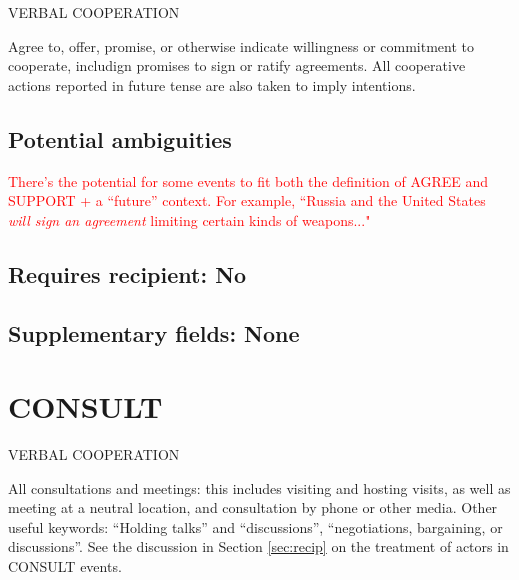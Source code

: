 \documentclass[11pt]{report}
\newcommand{\plcat}[1]{\textsf{#1}}
\newcommand{\andy}[1]{\textcolor{red}{#1}}
\begin{document}
\textsf{VERBAL COOPERATION} \vspace{8pt}

Agree to, offer, promise, or otherwise indicate willingness or commitment to cooperate, includign promises to sign or ratify agreements.  All cooperative actions reported in future tense are also taken to imply intentions. 

\begin{comment}
pas 2018-01-06

As I'm going through a lot of GSRs, I'm beginning to wonder whether we should combine AGREE and SUPPORT: it's not really clear to me whether the boundary is between them. This would continue a consolidation of the various WEIS verbal categories -- e.g. AGREE/PROMISE, WARNING/THREAT -- that we initiated with CAMEO.
\end{comment}

\subsection{Potential ambiguities}

\andy{There's the potential for some events to fit both the definition of \plcat{AGREE} and \plcat{SUPPORT} + a ``future'' context. For example, ``Russia and the United States \emph{will sign an agreement} limiting certain kinds of weapons..."}

\subsection{Requires recipient: No}

\subsection{Supplementary fields: None}

\bigskip  

\section{CONSULT}

\textsf{VERBAL COOPERATION} \vspace{8pt}

All consultations and meetings: this includes visiting and hosting visits, as well as meeting at a neutral location, and consultation by phone or other media. Other useful keywords: ``Holding talks'' and ``discussions'', ``negotiations, bargaining, or discussions''. See the discussion in Section \ref{sec:recip} on the treatment of actors in \plcat{CONSULT} events.
\end{document}

